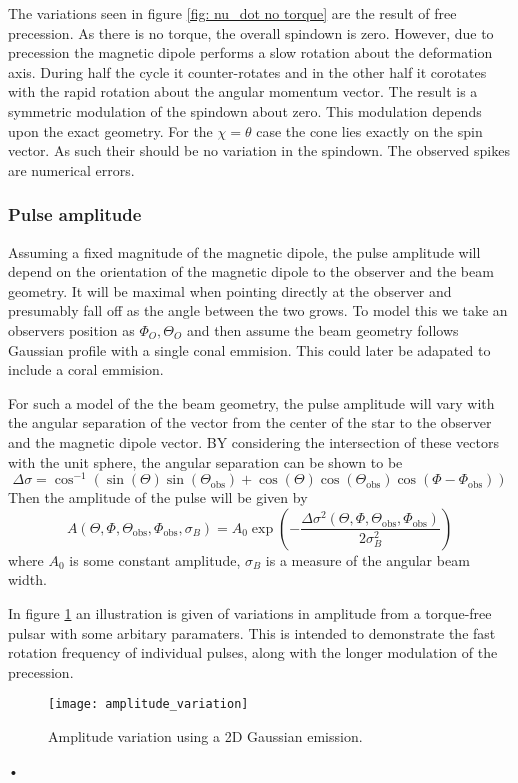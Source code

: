 \documentclass[/home/greg/Thesis/main/main.tex]{subfiles}
\begin{document}
The variations seen in figure \ref{fig: nu_dot no torque} are the result of
free precession. As there is no torque, the overall spindown is zero. However,
due to precession the magnetic dipole performs a slow rotation about the
deformation axis. During half the cycle it counter-rotates and in the other
half it corotates with the rapid rotation about the angular momentum vector.
The result is a symmetric modulation of the spindown about zero. This
modulation depends upon the exact geometry. For the $\chi=\theta$ case the cone
lies exactly on the spin vector. As such their should be no variation in the
spindown. The observed spikes are numerical errors.

\subsubsection{Pulse amplitude}
Assuming a fixed magnitude of the magnetic dipole, the pulse amplitude will 
depend on the orientation of the magnetic dipole to the observer and the
beam geometry. It will be 
maximal when pointing directly at the observer and presumably fall off as the
angle between the two grows. To model this we take an observers position as 
$\Phi_{O}, \Theta_{O}$ and then assume the beam geometry follows
Gaussian profile with a single conal emmision. This could later be adapated
to include a coral emmision.

For such a model of the the beam geometry, the pulse amplitude will vary with the 
angular separation of the vector from the center of the star to the observer and the
magnetic dipole vector. BY considering the intersection of these vectors with
the unit sphere, the angular separation can be shown to be
\newcommand{\ThetaO}{\Theta_{\mathrm{obs}}}
\newcommand{\PhiO}{\Phi_{\mathrm{obs}}}
\newcommand{\sigmaB}{\sigma_{B}}
\begin{equation}
\Delta\sigma = \cos^{-1}\left(\sin(\Theta)\sin(\ThetaO) +
                             \cos(\Theta)\cos(\ThetaO)\cos(\Phi - \PhiO)\right) 
\label{eqn: angular sep}
\end{equation}
Then the amplitude of the pulse will be given by 
\begin{equation}
A(\Theta, \Phi, \ThetaO, \PhiO, \sigmaB) = 
A_{0} \exp\left(-\frac{\Delta\sigma^{2}(\Theta, \Phi, \ThetaO, \PhiO)}{2\sigmaB^{2}}\right)
\label{eqn: beam amplitude}
\end{equation}
where $A_{0}$ is some constant amplitude, $\sigmaB$ is a measure of the 
angular beam width.

In figure \ref{fig: amplitude variation} an illustration is given of variations 
in amplitude from a torque-free pulsar with some arbitary paramaters. This is
intended to demonstrate the fast rotation frequency of individual pulses, along
with the longer modulation of the precession.
\begin{figure}[htb]
\centering
\texttt{[image: amplitude\_variation]}
\caption{Amplitude variation using a 2D Gaussian emission.}
\label{fig: amplitude variation}
\end{figure}•
\end{document}
